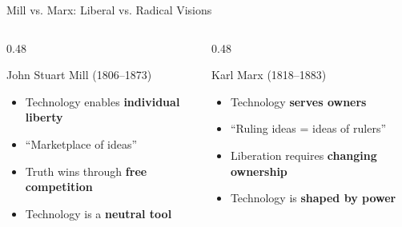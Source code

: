 \documentclass[aspectratio=169,11pt]{beamer}
\begin{document}
\begin{frame}{Mill vs. Marx: Liberal vs. Radical Visions}
\begin{columns}
\begin{column}{0.48\textwidth}
\begin{block}{John Stuart Mill (1806--1873)}
\begin{itemize}
  \item Technology enables \textbf{individual liberty}
  \item ``Marketplace of ideas''
  \item Truth wins through \textbf{free competition}
  \item Technology is a \textbf{neutral tool}
\end{itemize}
\end{block}
\end{column}

\begin{column}{0.48\textwidth}
\begin{alertblock}{Karl Marx (1818--1883)}
\begin{itemize}
  \item Technology \textbf{serves owners}
  \item ``Ruling ideas = ideas of rulers''
  \item Liberation requires \textbf{changing ownership}
  \item Technology is \textbf{shaped by power}
\end{itemize}
\end{alertblock}
\end{column}
\end{columns}

\vspace{0.5em}
\end{frame}
\end{document}
